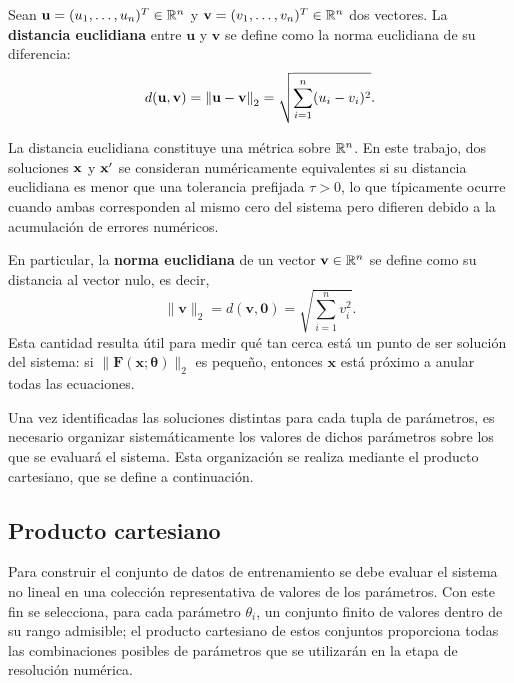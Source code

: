 \begin{definition} Sean \(\mathbf{u} = (u_1, \dots, u_n)^T \in \mathbb{R}^n\) y \(\mathbf{v} = (v_1, \dots, v_n)^T \in \mathbb{R}^n\) dos vectores. La \textbf{distancia euclidiana} entre \(\mathbf{u}\) y \(\mathbf{v}\) se define como la norma euclidiana de su diferencia: \begin{equation} d(\mathbf{u}, \mathbf{v}) = \left\lVert\mathbf{u} - \mathbf{v}\right\rVert_2 = \sqrt{\sum_{i=1}^{n} (u_i - v_i)^2}. \end{equation} \end{definition}

La distancia euclidiana constituye una métrica sobre \(\mathbb{R}^n\). En este trabajo, dos soluciones \(\mathbf{x}\) y \(\mathbf{x}'\) se consideran numéricamente equivalentes si su distancia euclidiana es menor que una tolerancia prefijada \(\tau > 0\), lo que típicamente ocurre cuando ambas corresponden al mismo cero del sistema pero difieren debido a la acumulación de errores numéricos.

En particular, la \textbf{norma euclidiana} de un vector \(\mathbf{v}\in\mathbb{R}^n\) se define como su distancia al vector nulo, es decir, \begin{equation} \|\mathbf{v}\|_2 = d(\mathbf{v}, \mathbf{0}) = \sqrt{\sum_{i=1}^{n} v_i^2}. \label{eq:norma_euclidiana} \end{equation} Esta cantidad resulta útil para medir qué tan cerca está un punto de ser solución del sistema: si \(\|\mathbf{F}(\mathbf{x}; \boldsymbol{\theta})\|_2\) es pequeño, entonces \(\mathbf{x}\) está próximo a anular todas las ecuaciones.

Una vez identificadas las soluciones distintas para cada tupla de parámetros, es necesario organizar sistemáticamente los valores de dichos parámetros sobre los que se evaluará el sistema. Esta organización se realiza mediante el producto cartesiano, que se define a continuación.

\subsection{Producto cartesiano}

Para construir el conjunto de datos de entrenamiento se debe evaluar el sistema no lineal en una colección representativa de valores de los parámetros. Con este fin se selecciona, para cada parámetro \(\theta_i\), un conjunto finito de valores dentro de su rango admisible; el producto cartesiano de estos conjuntos proporciona todas las combinaciones posibles de parámetros que se utilizarán en la etapa de resolución numérica.

